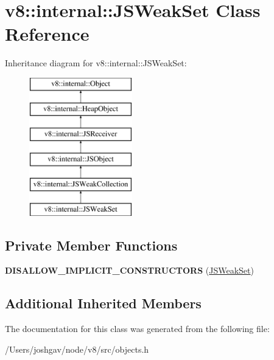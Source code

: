 \hypertarget{classv8_1_1internal_1_1_j_s_weak_set}{}\section{v8\+:\+:internal\+:\+:J\+S\+Weak\+Set Class Reference}
\label{classv8_1_1internal_1_1_j_s_weak_set}
Inheritance diagram for v8\+:\+:internal\+:\+:J\+S\+Weak\+Set\+:\begin{figure}[H]
\begin{center}
\leavevmode
\includegraphics[height=6.000000cm]{classv8_1_1internal_1_1_j_s_weak_set}
\end{center}
\end{figure}
\subsection*{Private Member Functions}
\begin{DoxyCompactItemize}
\item 
{\bfseries D\+I\+S\+A\+L\+L\+O\+W\+\_\+\+I\+M\+P\+L\+I\+C\+I\+T\+\_\+\+C\+O\+N\+S\+T\+R\+U\+C\+T\+O\+RS} (\hyperlink{classv8_1_1internal_1_1_j_s_weak_set}{J\+S\+Weak\+Set})\hypertarget{classv8_1_1internal_1_1_j_s_weak_set_a23874bd9d8d5b8cccf3727d187b3fb1e}{}\label{classv8_1_1internal_1_1_j_s_weak_set_a23874bd9d8d5b8cccf3727d187b3fb1e}

\end{DoxyCompactItemize}
\subsection*{Additional Inherited Members}


The documentation for this class was generated from the following file\+:\begin{DoxyCompactItemize}
\item 
/\+Users/joshgav/node/v8/src/objects.\+h\end{DoxyCompactItemize}
